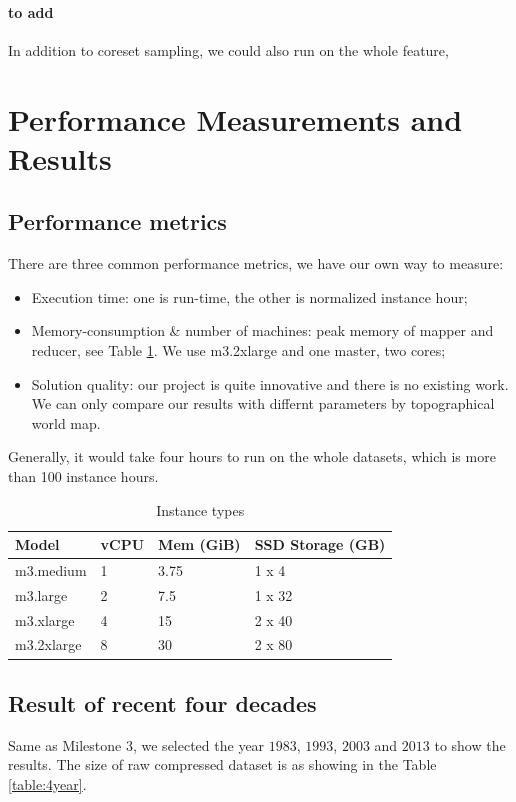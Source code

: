 \paragraph{to add}
In addition to coreset sampling, we could also run on the whole feature, 

\section{Performance Measurements and Results}

\subsection{Performance metrics}
There are three common performance metrics, we have our own way to measure:
\begin{itemize}
    \item Execution time: one is run-time, the other is normalized instance hour;
    \item Memory-consumption \& number of machines: peak memory of mapper and reducer, see Table \ref{table:m3}. We use m3.2xlarge and one master, two cores;
    \item Solution quality: our project is quite innovative and there is no existing work. We can only compare our results with differnt parameters by topographical world map\cite{world}.
\end{itemize}
Generally, it would take four hours to run on the whole datasets, which is more than 100 instance hours.

\begin{table}[htbp]
    \centering
    \label{table:m3}
    \begin{tabular}{|l|l|l|l|}
        \hline
        Model & vCPU & Mem (GiB) & SSD Storage (GB) \\
        \hline
        m3.medium & 1 & 3.75 & 1 x 4  \\
        m3.large  & 2 & 7.5 & 1 x 32 \\
        m3.xlarge & 4 & 15 & 2 x 40 \\
        m3.2xlarge& 8 & 30 & 2 x 80 \\
        \hline
    \end{tabular}
    \caption{Instance types}
\end{table}

\subsection{Result of recent four decades}
Same as Milestone $3$, we selected the year $1983$, $1993$, $2003$ and $2013$ to show the results. The size of raw compressed dataset is as showing in the Table \ref{table:4year}.

